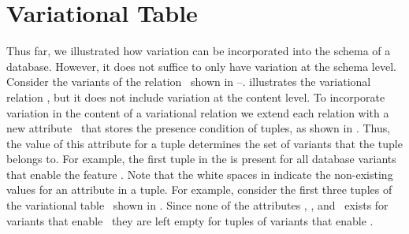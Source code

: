 \section{Variational Table}
\label{sec:vtab}


Thus far, 
we illustrated how variation can be incorporated into the schema of a database.
However, it does not suffice to only have variation at the schema level. Consider the 
variants of the relation \empbio\ shown in --.
 illustrates the variational relation \empbio, but it does not include
variation at the content level.
To incorporate variation in the content of a variational relation we
extend each relation with a new attribute \pcatt\ that stores 
the presence condition of tuples, as shown in
. Thus,
the value of this attribute for a tuple determines the set of variants that the tuple
belongs to. For example, the first tuple in the  is present for
all database variants that enable the feature \vThree. 
%
Note that the white spaces in  indicate the non-existing values
for an attribute in a tuple. For example, consider the first three tuples of the variational
table \empbio\ shown in . Since none of the attributes \name, \fname, and \lname\
exists for variants that enable \vThree\ they are left empty for tuples of variants that enable
\vThree.




